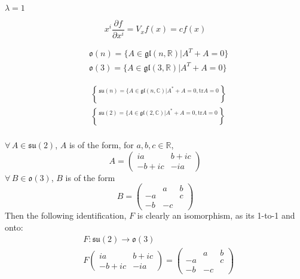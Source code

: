$\lambda = 1$

\[
\boxed{ x^i \frac{ \partial f}{ \partial x^i } = V_x f(x) = cf(x) }
\]


\hrulefill





\[
\begin{aligned}
  & \mathfrak{o}{(n)} = \lbrace A \in \mathfrak{gl}(n,\mathbb{R}) | A^T + A = 0 \rbrace \\ 
  & \mathfrak{o}{(3)} = \lbrace A \in \mathfrak{gl}(3,\mathbb{R}) | A^T + A = 0 \rbrace 
\end{aligned}
\]


\[
\begin{aligned}
& \mathfrak{su}(n) = \lbrace A \in \mathfrak{gl}(n,\mathbb{C}) | A^* + A = 0 , \text{tr}A = 0 \brace \\ 
& \mathfrak{su}(2) = \lbrace A \in \mathfrak{gl}(2,\mathbb{C}) | A^* + A = 0 , \text{tr}A = 0 \brace \\ 
\end{aligned}
\]

$\forall \, A \in \mathfrak{su}(2)$, $A$ is of the form, for $a,b,c \in \mathbb{R}$, 
\[
A = \left( \begin{matrix} ia & b + ic \\ 
  -b + i c & -ia \end{matrix} \right)
\]
$\forall \, B \in \mathfrak{o}(3)$, $B$ is of the form 
\[
B = \left( \begin{matrix}  & a & b \\ 
  -a & & c \\ 
  -b & -c & \end{matrix} \right)
\]
Then the following identification, $F$ is clearly an isomorphism, as its 1-to-1 and onto:
\[
\begin{aligned}
  & F : \mathfrak{su}(2) \to \mathfrak{o}(3) \\ 
  & F\left( \begin{matrix} ia & b + ic \\ 
    -b + ic & -ia \end{matrix} \right) = \left( \begin{matrix} & a & b \\ 
    -a & & c \\
    -b & -c & \end{matrix} \right)
\end{aligned}
\]

